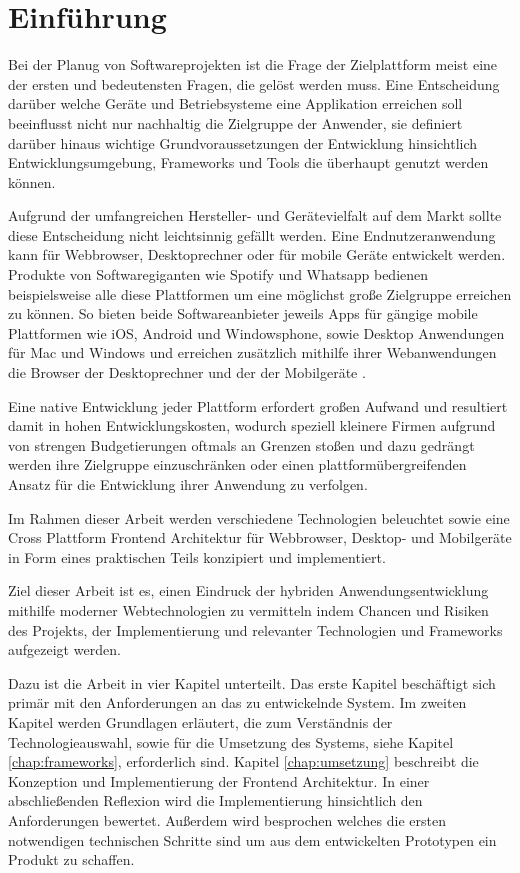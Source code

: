 
\chapter{Einführung}
\label{chap:introduction}

Bei der Planug von Softwareprojekten ist die Frage der Zielplattform meist eine der ersten und bedeutensten Fragen,
die gelöst werden muss. Eine Entscheidung darüber welche Geräte und Betriebsysteme eine Applikation erreichen soll
beeinflusst nicht nur nachhaltig die Zielgruppe der Anwender, sie definiert darüber hinaus wichtige Grundvoraussetzungen der Entwicklung hinsichtlich Entwicklungsumgebung, Frameworks und Tools die überhaupt genutzt werden können.

Aufgrund der umfangreichen Hersteller- und Gerätevielfalt auf dem Markt sollte diese Entscheidung nicht leichtsinnig gefällt werden.
Eine Endnutzeranwendung kann für Webbrowser, Desktoprechner oder für mobile Geräte entwickelt werden.
Produkte von Softwaregiganten wie Spotify und Whatsapp bedienen beispielsweise alle diese Plattformen um eine möglichst große Zielgruppe erreichen zu können.
So bieten beide Softwareanbieter jeweils Apps für gängige mobile Plattformen wie iOS, Android und Windowsphone,
sowie Desktop Anwendungen für Mac und Windows und erreichen zusätzlich mithilfe ihrer Webanwendungen die Browser der Desktoprechner
und der der Mobilgeräte \cite{Spoti93:online} \cite{Whats74:online} \cite{Whats6:online}.

Eine native Entwicklung jeder Plattform erfordert großen Aufwand und resultiert damit in hohen
Entwicklungskosten, wodurch speziell kleinere Firmen aufgrund von strengen Budgetierungen oftmals
an Grenzen stoßen und
dazu gedrängt werden ihre Zielgruppe einzuschränken oder einen plattformübergreifenden Ansatz für
die Entwicklung ihrer Anwendung zu verfolgen.

Im Rahmen dieser Arbeit werden verschiedene Technologien beleuchtet sowie eine
Cross Plattform Frontend Architektur für Webbrowser, Desktop- und Mobilgeräte in Form eines praktischen Teils
konzipiert und implementiert.

Ziel dieser Arbeit ist es, einen Eindruck der hybriden Anwendungsentwicklung mithilfe moderner
Webtechnologien zu vermitteln indem Chancen und Risiken des Projekts, der Implementierung und relevanter Technologien und Frameworks aufgezeigt werden.

\vspace{0.6cm}

\noindent
Dazu ist die Arbeit in vier Kapitel unterteilt. Das erste Kapitel beschäftigt sich primär mit den
Anforderungen an das zu entwickelnde System.
Im zweiten Kapitel werden Grundlagen erläutert, die zum Verständnis der Technologieauswahl,
sowie für die Umsetzung des Systems, siehe Kapitel \ref{chap:frameworks}, erforderlich sind.
Kapitel \ref{chap:umsetzung} beschreibt die Konzeption und Implementierung der Frontend Architektur.
In einer abschließenden Reflexion wird die Implementierung hinsichtlich den Anforderungen bewertet.
Außerdem wird besprochen welches die ersten notwendigen technischen Schritte sind um aus dem entwickelten Prototypen ein Produkt zu schaffen.
